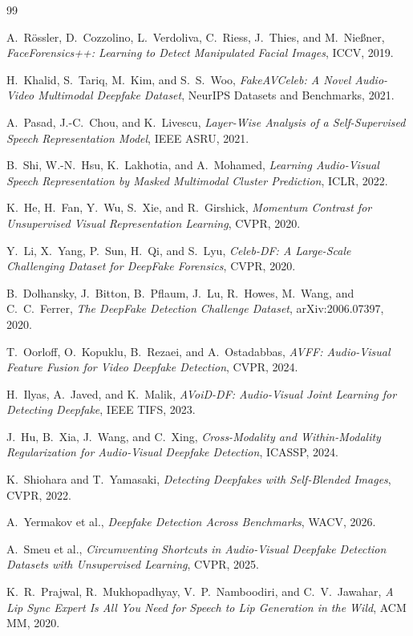 \documentclass[12pt, letterpaper]{article}
\begin{document}

\begin{thebibliography}{99}

A.~R{\"o}ssler, D.~Cozzolino, L.~Verdoliva, C.~Riess, J.~Thies, and M.~Nie{\ss}ner,
\textit{FaceForensics++: Learning to Detect Manipulated Facial Images},
ICCV, 2019.

H.~Khalid, S.~Tariq, M.~Kim, and S.~S.~Woo,
\textit{FakeAVCeleb: A Novel Audio-Video Multimodal Deepfake Dataset},
NeurIPS Datasets and Benchmarks, 2021.

A.~Pasad, J.-C.~Chou, and K.~Livescu,
\textit{Layer-Wise Analysis of a Self-Supervised Speech Representation Model},
IEEE ASRU, 2021.

B.~Shi, W.-N.~Hsu, K.~Lakhotia, and A.~Mohamed,
\textit{Learning Audio-Visual Speech Representation by Masked Multimodal Cluster Prediction},
ICLR, 2022.

K.~He, H.~Fan, Y.~Wu, S.~Xie, and R.~Girshick,
\textit{Momentum Contrast for Unsupervised Visual Representation Learning},
CVPR, 2020.

Y.~Li, X.~Yang, P.~Sun, H.~Qi, and S.~Lyu,
\textit{Celeb-DF: A Large-Scale Challenging Dataset for DeepFake Forensics},
CVPR, 2020.

B.~Dolhansky, J.~Bitton, B.~Pflaum, J.~Lu, R.~Howes, M.~Wang, and C.~C.~Ferrer,
\textit{The DeepFake Detection Challenge Dataset},
arXiv:2006.07397, 2020.

T.~Oorloff, O.~Kopuklu, B.~Rezaei, and A.~Ostadabbas,
\textit{AVFF: Audio-Visual Feature Fusion for Video Deepfake Detection},
CVPR, 2024.

H.~Ilyas, A.~Javed, and K.~Malik,
\textit{AVoiD-DF: Audio-Visual Joint Learning for Detecting Deepfake},
IEEE TIFS, 2023.

J.~Hu, B.~Xia, J.~Wang, and C.~Xing,
\textit{Cross-Modality and Within-Modality Regularization for Audio-Visual Deepfake Detection},
ICASSP, 2024.

K.~Shiohara and T.~Yamasaki,
\textit{Detecting Deepfakes with Self-Blended Images},
CVPR, 2022.

A.~Yermakov et al.,
\textit{Deepfake Detection Across Benchmarks},
WACV, 2026.

A.~Smeu et al.,
\textit{Circumventing Shortcuts in Audio-Visual Deepfake Detection Datasets with Unsupervised Learning},
CVPR, 2025.

K.~R.~Prajwal, R.~Mukhopadhyay, V.~P.~Namboodiri, and C.~V.~Jawahar,
\textit{A Lip Sync Expert Is All You Need for Speech to Lip Generation in the Wild},
ACM MM, 2020.

\end{thebibliography}
\end{document}
